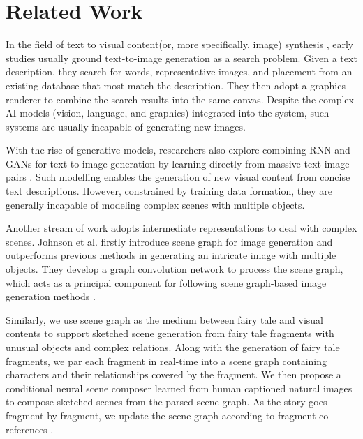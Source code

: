 \section{Related Work}

In the field of text to visual content(or, more specifically, image) synthesis \cite{Gregor2015DRAWAR,Herzig2019,Johnson2018,Koh2020TexttoImageGG,Li2019ObjectDrivenTS,Mansimov2016GeneratingIF,Ramesh2021ZeroShotTG,Reed2016GenerativeAT,Schuster2015GeneratingSP,Yan2016,Zhang2017StackGANTT,Zhang2019StackGANRI}, early studies \cite{Zhu} usually ground text-to-image generation as a search problem. Given a text description, they search for words, representative images, and placement from an existing database that most match the description. They then adopt a graphics renderer to combine the search results into the same canvas. Despite the complex AI models (vision, language, and graphics) integrated into the system, such systems are usually incapable of generating new images. 

With the rise of generative models\cite{Goodfellow2020,Mirza2014}, researchers also explore combining RNN and GANs for text-to-image generation by learning directly from massive text-image pairs \cite{Gregor2015DRAWAR,Li2019ObjectDrivenTS,Koh2020TexttoImageGG,Mansimov2016GeneratingIF,Ramesh2021ZeroShotTG,Reed2016GenerativeAT,Zhang2017StackGANTT,Zhang2019StackGANRI}. Such modelling enables the generation of new visual content from concise text descriptions. However, constrained by training data formation, they are generally incapable of modeling complex scenes with multiple objects.

Another stream of work adopts intermediate representations to deal with complex scenes. Johnson et al.\cite{Johnson2018} firstly introduce scene graph for image generation and outperforms previous methods in generating an intricate image with multiple objects. They develop a graph convolution network to process the scene graph, which acts as a principal component for following scene graph-based image generation methods \cite{Herzig2019,Schuster2015GeneratingSP}.

Similarly, we use scene graph as the medium between fairy tale and visual contents to support sketched scene generation from fairy tale fragments with unusual objects and complex relations. Along with the generation of fairy tale fragments, we par each fragment in real-time into a scene graph containing characters and their relationships covered by the fragment. We then propose a conditional neural scene composer learned from human captioned natural images to compose sketched scenes from the parsed scene graph. As the story goes fragment by fragment, we update the scene graph according to fragment co-references \cite{Sukthanker2020AnaphoraAC}.


